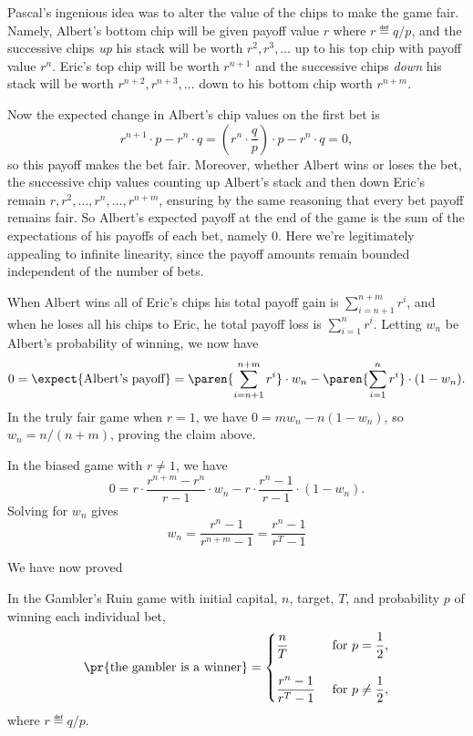 Pascal's ingenious idea was to alter the value of the chips to make
the game fair.  Namely, Albert's bottom chip will be given payoff
value $r$ where $r \eqdef q/p$, and the successive chips \emph{up} his
stack will be worth $r^{2},r^{3},\dots$ up to his top chip with payoff
value $r^n$.  Eric's top chip will be worth $r^{n+1}$ and the
successive chips \emph{down} his stack will be worth
$r^{n+2},r^{n+3},\dots$ down to his bottom chip worth $r^{n+m}$.

Now the expected change in Albert's chip values on the first bet is
\[
r^{n+1}\cdot p - r^n\cdot q
   = (r^n \cdot \frac{q}{p}) \cdot p - r^n\cdot q = 0,
\]
so this payoff makes the bet fair.  Moreover, whether Albert wins or
loses the bet, the successive chip values counting up Albert's stack
and then down Eric's remain $r,r^2,\dots,r^n,\dots,r^{n+m}$, ensuring
by the same reasoning that every bet payoff remains fair.  So Albert's
expected payoff at the end of the game is the sum of the expectations
of his payoffs of each bet, namely 0.  Here we're legitimately
appealing to infinite linearity, since the payoff amounts remain
bounded independent of the number of bets.

When Albert wins all of Eric's chips his total payoff gain is
$\sum_{i=n+1}^{n+m} r^i$, and when he loses all his chips to Eric, he
total payoff loss is $\sum_{i=1}^n r^i$.  Letting $w_n$ be Albert's
probability of winning, we now have
\[
0 = \expect{\text{Albert's payoff}} = \paren{\sum_{i=n+1}^{n+m}
  r^i}\cdot w_n  - \paren{\sum_{i=1}^n r^i} \cdot (1-w_n).
\]
In the truly fair game when $r=1$, we have $0 = mw_n - n(1-w_n)$, so
$w_n = n/(n+m)$, proving the claim above.

In the biased game with $r\neq 1$, we have
\[
0 =   r \cdot \frac{r^{n+m} - r^{n}}{r-1} \cdot w_n
        - r \cdot \frac{r^{n}-1}{r-1}\cdot (1-w_n).
\]
Solving for $w_n$ gives
\begin{equation}\label{LN12:wnsol}
w_n = \frac{r^n-1}{r^{n+m} -1} = \frac{r^n-1}{r^{T} -1}
\end{equation}

We have now proved
\begin{theorem}\label{thm:gamblerruin}
  In the Gambler's Ruin game with initial capital, $n$, target, $T$,
  and probability $p$ of winning each individual bet,
\begin{equation}\label{eq:gamblerruin}
\pr{\text{the gambler is a winner}} =
\begin{cases}
 \dfrac{n}{T} & \text{ for } p = \dfrac{1}{2},\\
              &   \\
 \dfrac{r^n-1}{r^{T} -1} & \text{ for } p \neq \dfrac{1}{2},
\end{cases}
\end{equation}
where $r \eqdef q/p$.
\end{theorem}

